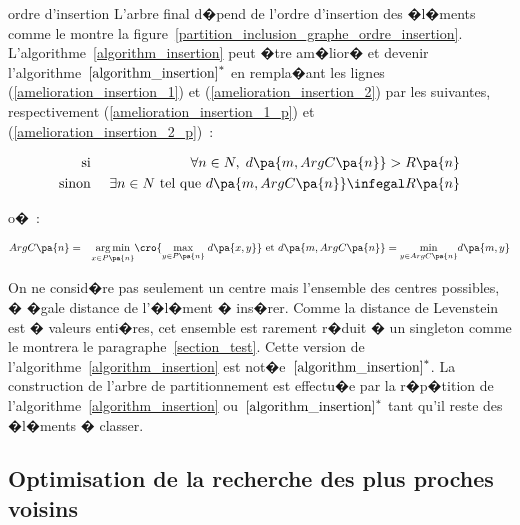 \begin{xremark}{ordre d'insertion}
L'arbre final d�pend de l'ordre d'insertion des �l�ments comme le montre la 
figure~\ref{partition_inclusion_graphe_ordre_insertion}. L'algorithme~\ref{algorithm_insertion} peut �tre am�lior� et devenir l'algorithme~$\ref{algorithm_insertion}^*$ en rempla�ant les lignes (\ref{amelioration_insertion_1}) et (\ref{amelioration_insertion_2}) par les suivantes, respectivement (\ref{amelioration_insertion_1_p}) et (\ref{amelioration_insertion_2_p})~:

    \begin{eqnarray}
    \text{si }      && \forall n \in N, \; d\pa{m,ArgC\pa{n}} > R\pa{n} \label{amelioration_insertion_1_p} \\
    \text{sinon }   && \exists n \in N \text{ tel que } d\pa{m,ArgC\pa{n}} \infegal R\pa{n}
    \label{amelioration_insertion_2_p}
    \end{eqnarray}

o�~:

    \begin{eqnarray*}
    ArgC\pa{n}            &=&     \underset{x \in P\pa{n}} {\arg \min} 
                                                                \cro{  \underset{y \in P\pa{n}} {\max} \; d\pa{x,y}} \text{ et }
    d\pa{m,ArgC\pa{n}}    =     \underset{y \in ArgC\pa{n}} {\min } d\pa{m,y}
    \end{eqnarray*}

On ne consid�re pas seulement un centre mais l'ensemble des centres possibles, � �gale distance de l'�l�ment � ins�rer. Comme la distance de Levenstein est � valeurs enti�res, cet ensemble est rarement r�duit � un singleton comme le montrera le paragraphe~\ref{section_test}. Cette version de l'algorithme~\ref{algorithm_insertion} est not�e~$\ref{algorithm_insertion}^*$. La construction de l'arbre de partitionnement est effectu�e par la r�p�tition de l'algorithme~\ref{algorithm_insertion} ou~$\ref{algorithm_insertion}^*$ tant qu'il reste des �l�ments � classer.


\end{xremark}













\subsection{Optimisation de la recherche des plus proches voisins}
\label{section_optimisation_distance}

